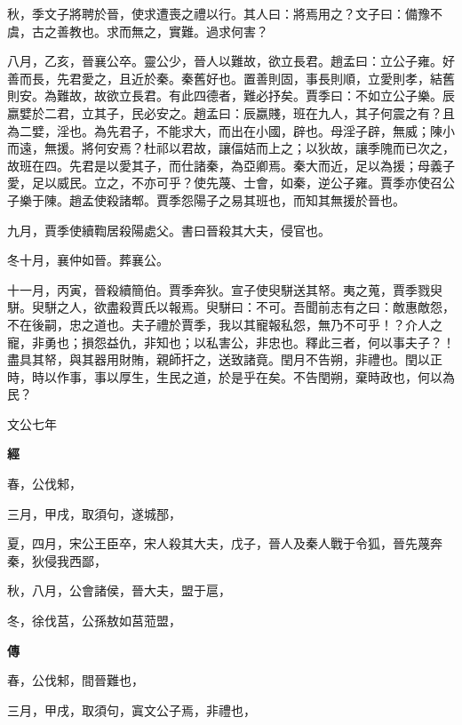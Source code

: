 \documentclass{ctexart}
\begin{document}
秋，季文子將聘於晉，使求遭喪之禮以行。其人曰：將焉用之？文子曰：備豫不虞，古之善教也。求而無之，實難。過求何害？

八月，乙亥，晉襄公卒。靈公少，晉人以難故，欲立長君。趙孟曰：立公子雍。好善而長，先君愛之，且近於秦。秦舊好也。置善則固，事長則順，立愛則孝，結舊則安。為難故，故欲立長君。有此四德者，難必抒矣。賈季曰：不如立公子樂。辰嬴嬖於二君，立其子，民必安之。趙孟曰：辰嬴賤，班在九人，其子何震之有？且為二嬖，淫也。為先君子，不能求大，而出在小國，辟也。母淫子辟，無威；陳小而遠，無援。將何安焉？杜祁以君故，讓偪姞而上之；以狄故，讓季隗而已次之，故班在四。先君是以愛其子，而仕諸秦，為亞卿焉。秦大而近，足以為援；母義子愛，足以威民。立之，不亦可乎？使先蔑、士會，如秦，逆公子雍。賈季亦使召公子樂于陳。趙孟使殺諸郫。賈季怨陽子之易其班也，而知其無援於晉也。

九月，賈季使續鞫居殺陽處父。書曰晉殺其大夫，侵官也。

冬十月，襄仲如晉。葬襄公。

十一月，丙寅，晉殺續簡伯。賈季奔狄。宣子使臾駢送其帑。夷之蒐，賈季戮臾駢。臾駢之人，欲盡殺賈氏以報焉。臾駢曰：不可。吾聞前志有之曰：敵惠敵怨，不在後嗣，忠之道也。夫子禮於賈季，我以其寵報私怨，無乃不可乎！？介人之寵，非勇也；損怨益仇，非知也；以私害公，非忠也。釋此三者，何以事夫子？！盡具其帑，與其器用財賄，親師扞之，送致諸竟。閏月不告朔，非禮也。閏以正時，時以作事，事以厚生，生民之道，於是乎在矣。不告閏朔，棄時政也，何以為民？





文公七年


\textbf{經}



春，公伐邾，

三月，甲戌，取須句，遂城郚，

夏，四月，宋公王臣卒，宋人殺其大夫，戊子，晉人及秦人戰于令狐，晉先蔑奔秦，狄侵我西鄙，

秋，八月，公會諸侯，晉大夫，盟于扈，

冬，徐伐莒，公孫敖如莒蒞盟，

\textbf{傳}



春，公伐邾，間晉難也，

三月，甲戌，取須句，寘文公子焉，非禮也，
\end{document}
